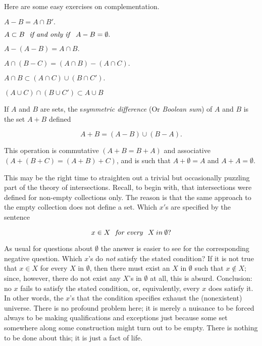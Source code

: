 Here are some easy exercises on complementation. 

\begin{center}
$A - B = A \cap B'.$

$A \subset B \text{ \textit{ if and only if } } A - B = \emptyset .$

$A - (A - B) = A \cap B.$

$A \cap (B - C) = (A \cap B) - (A \cap C).$

$A \cap B  \subset (A \cap C) \cup (B \cap C').$

$(A \cup C) \cap (B \cup C') \subset A \cup B$
\end{center}

If $A$ and $B$ are sets, the s\textit{symmetric difference} (Or \textit{Boolean sum}) of $A$ and $B$ is the set $A + B$ defined 

\begin{equation*}
A + B = (A - B) \cup (B - A). 
\end{equation*}

This operation is commutative $(A + B = B + A)$ and associative $(A + (B + C) =  (A + B) + C)$, and is such that $A + \emptyset = A$ and $A + A = \emptyset$.

This may be the right time to straighten out a trivial but occasionally puzzling part of the theory of intersections. Recall, to begin with, that intersections were defined for non-empty collections only. The reason is that the same approach to the empty collection does not define a set. Which $x'$s are specified by the sentence 

\begin{equation*}
x \in X \text{ \textit{ for every } } X \: in \: \emptyset ? 
\end{equation*}


As usual for questions about $ \emptyset $ the answer is easier to see for the corresponding negative question. Which $x$'s do \textit{not} satisfy the stated condition? If it is not true that $x \in X$ for every $X$ in $\emptyset$, then there must exist an $X$ in $\emptyset$ such that $x \notin X$; since, however, there do not exist any $X$'s in $ \emptyset $ at all, this is absurd. Conclusion: no $x$ fails to satisfy the stated condition, or, equivalently, every $x$ does satisfy it. In other words, the $x$'s that the condition specifies exhaust the (nonexistent) universe. There is no profound problem here; it is merely a nuisance to be forced always to be making qualifications and exceptions just because some set somewhere along some construction might turn out to be empty. There is nothing to be done about this; it is just a fact of life. 


